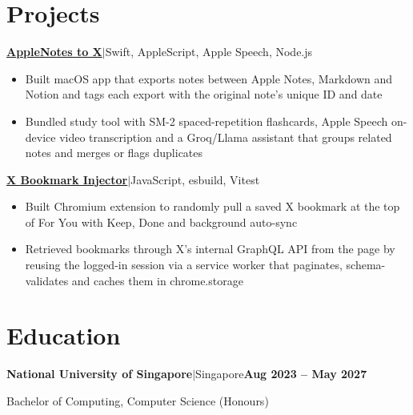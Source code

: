 \documentclass[a4paper,10pt]{article}
\newcommand{\pipe}{\hspace{6.1pt}$|$\hspace{6.1pt}}  %
\newcommand{\resumeItem}[1]{\item #1}
\newcommand{\resumeLine}[2]{\noindent #1\hfill\textbf{#2}\par}
\newcommand{\resumeItemListStart}{\begin{itemize}[label=\textbullet,align=left,leftmargin=10pt,labelsep=0pt,labelwidth=10pt,itemsep=0pt,topsep=1pt,parsep=0pt,partopsep=0pt]}
\newcommand{\resumeItemListEnd}{\end{itemize}}
\begin{document}
\section{Projects}
    \resumeLine{\href{https://github.com/wilsonsfh/AppleNotestoX}{\textbf{AppleNotes to X}}\pipe Swift, AppleScript, Apple Speech, Node.js}{}
      \resumeItemListStart
      \resumeItem{Built macOS app that exports notes between Apple Notes, Markdown and Notion and tags each export with the original note's unique ID and date}
      \resumeItem{Bundled study tool with SM-2 spaced-repetition flashcards, Apple Speech on-device video transcription and a Groq/Llama assistant that groups related notes and merges or flags duplicates}
      \resumeItemListEnd

    \resumeLine{\href{https://github.com/wilsonsfh/x-bookmark-injector}{\textbf{X Bookmark Injector}}\pipe JavaScript, esbuild, Vitest}{}
      \resumeItemListStart
      \resumeItem{Built Chromium extension to randomly pull a saved X bookmark at the top of For You with Keep, Done and background auto-sync}
       \resumeItem{Retrieved bookmarks through X's internal GraphQL API from the page by reusing the logged-in session via a service worker that paginates, schema-validates and caches them in chrome.storage}
      \resumeItemListEnd

\section{Education}
    \resumeLine{\textbf{National University of Singapore}\pipe Singapore}{Aug 2023 -- May 2027}
    \resumeLine{Bachelor of Computing, Computer Science (Honours)}{}
\end{document}
